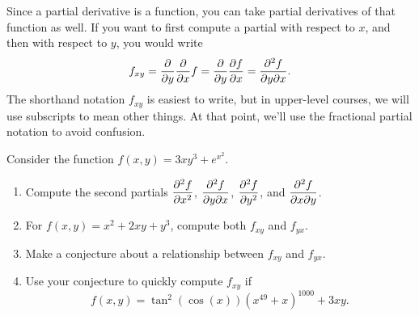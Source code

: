 Since a partial derivative is a function, you can take partial derivatives of that function as well.  If you want to first compute a partial with respect to $x$, and then with respect to $y$, you would write $$f_{xy}=\displaystyle\frac{\partial}{\partial y}\frac{\partial}{\partial x}f = \frac{\partial}{\partial y}\frac{\partial f}{\partial x} = \frac{\partial^2 f}{\partial y \partial x}.$$
The shorthand notation $f_{xy}$ is easiest to write, but in upper-level courses, we will use subscripts to mean other things. At that point, we'll use the fractional partial notation to avoid confusion.

\begin{problem}\label{second partials agree}%
Consider the function $f(x,y)=3xy^3+e^{x^2}.$
\begin{enumerate}
 \item Compute the second partials $\displaystyle \frac{\partial^2 f}{ \partial x^2}$, $\displaystyle\frac{\partial^2 f}{\partial y \partial x}$, $\displaystyle\frac{\partial^2 f}{\partial y^2}$, and $\displaystyle\frac{\partial^2 f}{\partial x \partial y}$.
 \item For $f(x,y)=x^2+2xy+y^3$, compute both $f_{xy}$ and $f_{yx}$.  
 \item Make a conjecture about a relationship between $f_{xy}$ and $f_{yx}$.
 \item Use your conjecture to quickly compute $f_{xy}$ if $$f(x,y)=\tan^{2}(\cos(x)) (x^{49}+x)^{1000}+3xy.$$ 
\end{enumerate}
\end{problem}



